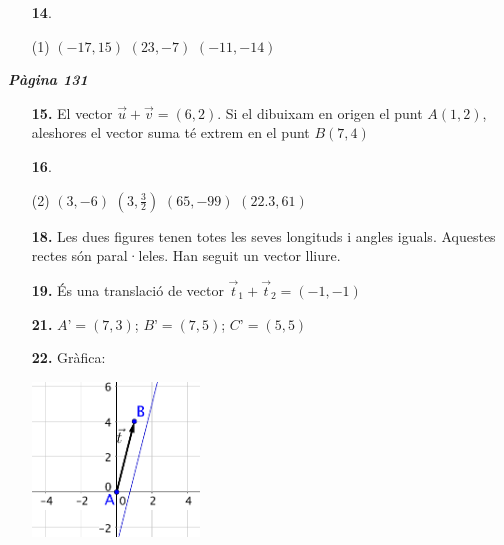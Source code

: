 \documentclass[a4paper, pdf, twoside]{book}
\begin{document}
\begin{multicols}{2}
\begin{enumerate}

 \item[\fontfamily{phv}\selectfont\color{blue}\textbf{14}. ]  \scalebox{0.6}{\simbolclau } 
 \begin{tasks}[column-sep=1em, item-indent=1.3333em](1)
	 \task $(-17,15)$
	 \task $(23,-7)$
	 \task $(-11,-14)$
\end{tasks}
 \end{enumerate}
\vspace{0.3cm}


{\textbf{\em Pàgina 131}} \hrulefill
\begin{enumerate}
\vspace{0.25cm}
\item[\fontfamily{phv}\selectfont\color{blue}\textbf{15. }] 
El vector $\vec u + \vec v = (6,2)$. Si el dibuixam en origen el punt $A(1,2)$, aleshores el vector suma té extrem en el punt $B(7,4)$
 \end{enumerate}
\begin{enumerate}
\vspace{0.25cm}



 \item[\fontfamily{phv}\selectfont\color{blue}\textbf{16}. ] 
 \begin{tasks}[column-sep=1em, item-indent=1.3333em](2)
	 \task $(3,-6)$
	 \task $(3,\frac {3}{2})$
	 \task $(65,-99)$
	 \task $(22.3,61)$
\end{tasks}
\vspace{0.25cm}
\item[\fontfamily{phv}\selectfont\color{blue}\textbf{18. }] 
Les dues figures tenen totes les seves longituds i angles iguals. Aquestes rectes són paral·leles. Han seguit un vector lliure.
\vspace{0.25cm}
\item[\fontfamily{phv}\selectfont\color{blue}\textbf{19. }]  \scalebox{0.6}{\simbolclau } 
És una translació de vector $\vec t_1 + \vec t_2 = (-1,-1)$
\vspace{0.25cm}
\item[\fontfamily{phv}\selectfont\color{blue}\textbf{21. }] 
$A’ = (7, 3)$; $B’ = (7, 5)$; $C’ = (5, 5)$
\vspace{0.25cm}
\item[\fontfamily{phv}\selectfont\color{blue}\textbf{22. }] 
Gràfica:\par \includegraphics [width=0.35\textwidth ]{img-sol/t10-23}
 \end{enumerate}
\vspace{0.3cm}


\end{multicols}
\end{document}
